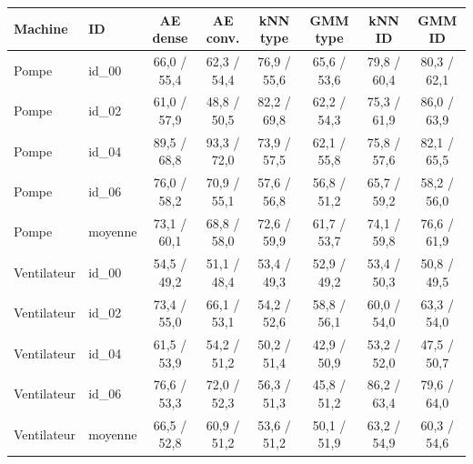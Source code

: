 \begin{tabular}{llcccccc}
\toprule
Machine & ID & AE dense & AE conv. & kNN type & GMM type & kNN ID & GMM ID \\
\midrule
Pompe & id\_00 & 66,0 / 55,4 & 62,3 / 54,4 & 76,9 / 55,6 & 65,6 / 53,6 & 79,8 / 60,4 & 80,3 / 62,1 \\
Pompe & id\_02 & 61,0 / 57,9 & 48,8 / 50,5 & 82,2 / 69,8 & 62,2 / 54,3 & 75,3 / 61,9 & 86,0 / 63,9 \\
Pompe & id\_04 & 89,5 / 68,8 & 93,3 / 72,0 & 73,9 / 57,5 & 62,1 / 55,8 & 75,8 / 57,6 & 82,1 / 65,5 \\
Pompe & id\_06 & 76,0 / 58,2 & 70,9 / 55,1 & 57,6 / 56,8 & 56,8 / 51,2 & 65,7 / 59,2 & 58,2 / 56,0 \\
Pompe & moyenne & 73,1 / 60,1 & 68,8 / 58,0 & 72,6 / 59,9 & 61,7 / 53,7 & 74,1 / 59,8 & 76,6 / 61,9 \\
\midrule
Ventilateur & id\_00 & 54,5 / 49,2 & 51,1 / 48,4 & 53,4 / 49,3 & 52,9 / 49,2 & 53,4 / 50,3 & 50,8 / 49,5 \\
Ventilateur & id\_02 & 73,4 / 55,0 & 66,1 / 53,1 & 54,2 / 52,6 & 58,8 / 56,1 & 60,0 / 54,0 & 63,3 / 54,0 \\
Ventilateur & id\_04 & 61,5 / 53,9 & 54,2 / 51,2 & 50,2 / 51,4 & 42,9 / 50,9 & 53,2 / 52,0 & 47,5 / 50,7 \\
Ventilateur & id\_06 & 76,6 / 53,3 & 72,0 / 52,3 & 56,3 / 51,3 & 45,8 / 51,2 & 86,2 / 63,4 & 79,6 / 64,0 \\
Ventilateur & moyenne & 66,5 / 52,8 & 60,9 / 51,2 & 53,6 / 51,2 & 50,1 / 51,9 & 63,2 / 54,9 & 60,3 / 54,6 \\
\bottomrule
\end{tabular}